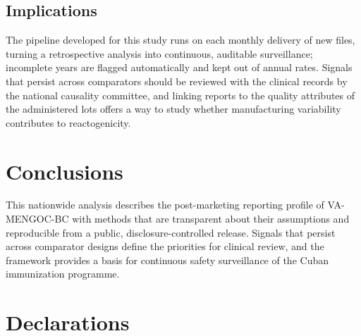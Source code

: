 \documentclass[11pt]{article}
\begin{document}
\subsection{Implications}\label{sec:d-implications}
The pipeline developed for this study runs on each monthly delivery of new files, turning a
retrospective analysis into continuous, auditable surveillance; incomplete years are flagged
automatically and kept out of annual rates. Signals that persist across comparators should
be reviewed with the clinical records by the national causality committee, and linking reports to
the quality attributes of the administered lots offers a way to study whether manufacturing
variability contributes to reactogenicity.

\section{Conclusions}\label{sec:conclusions}
This nationwide analysis describes the post-marketing reporting profile of VA-MENGOC-BC with
methods that are transparent about their assumptions and reproducible from a public,
disclosure-controlled release. Signals that persist across comparator designs define the
priorities for clinical review, and the framework provides a basis for continuous safety
surveillance of the Cuban immunization programme.

\section*{Declarations}




\end{document}
